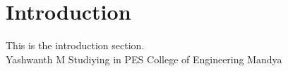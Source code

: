 \section{Introduction}
    This is the introduction section.\\
    Yashwanth M Studiying in PES College of Engineering Mandya
